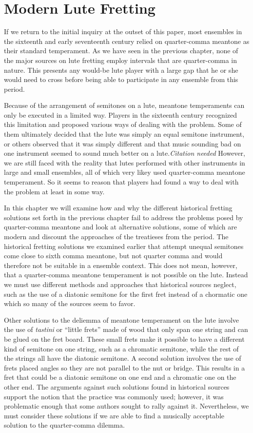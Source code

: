 \chapter{Modern Lute Fretting}

If we return to the initial inquiry at the outset of this paper, most ensembles in the
sixteenth and early seventeenth century relied on quarter-comma meantone as their standard
temperament. As we have seen in the previous chapter, none of the major sources on lute
fretting employ intervals that are quarter-comma in nature.  This presents any would-be
lute player with a large gap that he or she would need to cross before being able to
participate in any ensemble from this period.

Because of the arrangement of semitones on a lute, meantone temperaments can only be
executed in a limited way.  Players in the sixteenth century recognized this limitation
and proposed various ways of dealing with the problem.  Some of them ultimately decided
that the lute was simply an equal semitone instrument, or others observed that it was
simply different and that music sounding bad on one instrument seemed to sound much better
on a lute.\textit{Citation needed} However, we are still faced with the reality that lutes
performed with other instruments in large and small ensembles, all of which very likey
used quarter-comma meantone temperament.  So it seems to reason that players had found a
way to deal with the problem at least in some way.

In this chapter we will examine how and why the different historical fretting solutions
set forth in the previous chapter fail to address the problems posed by quarter-comma
meantone and look at alternative solutions, some of which are modern and discount the
approaches of the treatieses from the period. The historical fretting solutions we
examined earlier that attempt unequal semitones come close to sixth comma meantone, but
not quarter comma and would therefore not be suitable in a ensemble context.  This does
not mean, however, that a quarter-comma meantone temperament is not possible on the lute.
Instead we must use different methods and approaches that historical sources neglect, such
as the use of a diatonic semitone for the first fret instead of a chormatic one which so
many of the sources seem to favor.

Other solutions to the deliemma of meantone temperament on the lute involve the use of
\textit{tastini} or ``little frets'' made of wood that only span one string and can be
glued on the fret board.  These small frets make it possible to have a different kind of
semitone on one string, such as a chromatic semitone, while the rest of the strings all
have the diatonic semitone.  A second solution involves the use of frets placed angles so
they are not parallel to the nut or bridge.  This results in a fret that could be a
diatonic semitone on one end and a chromatic one on the other end.  The arguments against
such solutions found in historical sources support the notion that the practice was
commonly used; however, it was problematic enough that some authors sought to rally
against it. Nevertheless, we must consider these solutions if we are able to find a
musically acceptable solution to the quarter-comma dilemma.

